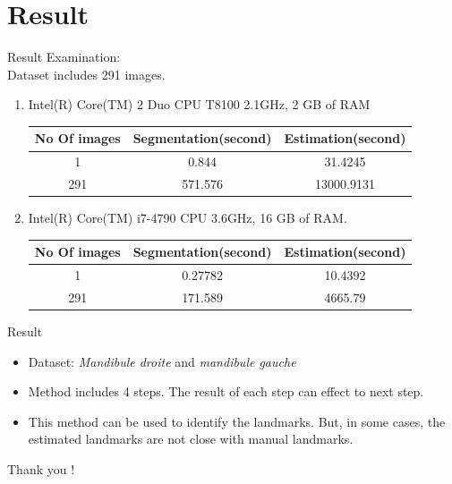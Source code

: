 \documentclass{beamer}
\begin{document}
\section{Result}
\begin{frame}Result
	Examination: \\[0.3cm]
	Dataset includes 291 images.
	\begin{enumerate}
		\item Intel(R) Core(TM) 2 Duo CPU T8100 2.1GHz, 2 GB of RAM
			\begin{center}
				\begin{tabular}{|c|c|c|}
					\hline
					No Of images & Segmentation(second) & Estimation(second) \\ \hline
					1 & 0.844 & 31.4245   \\ \hline
					291 & 571.576 & 13000.9131   \\ \hline
				\end{tabular}
			\end{center}
		\item Intel(R) Core(TM) i7-4790 CPU 3.6GHz, 16 GB of RAM.
			\begin{center}
			\begin{tabular}{|c|c|c|}
				\hline
				No Of images & Segmentation(second) & Estimation(second) \\ \hline
				1 & 0.27782 & 10.4392   \\ \hline
				291 & 171.589 & 4665.79   \\ \hline
			\end{tabular}
			\end{center}
	\end{enumerate}
\end{frame}
\begin{frame}{Result}
	\begin{itemize}
		\item Dataset: \textit{Mandibule droite} and \textit{mandibule gauche}
		\item Method includes 4 steps. The result of each step can effect to next step.
		\item This method can be used to identify the landmarks. But, in some cases, the estimated landmarks are not close with manual landmarks.
	\end{itemize}
\end{frame}
\begin{frame}[plain]
  \Huge{\centerline{Thank you !}}
\end{frame}
\end{document}
